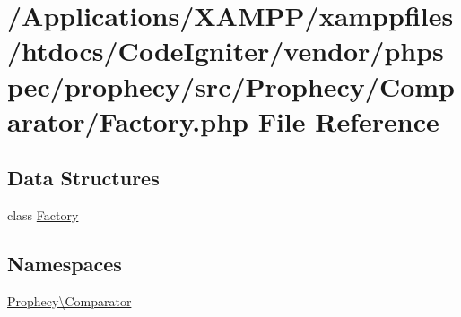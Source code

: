 \hypertarget{phpspec_2prophecy_2src_2_prophecy_2_comparator_2_factory_8php}{}\section{/\+Applications/\+X\+A\+M\+P\+P/xamppfiles/htdocs/\+Code\+Igniter/vendor/phpspec/prophecy/src/\+Prophecy/\+Comparator/\+Factory.php File Reference}
\label{phpspec_2prophecy_2src_2_prophecy_2_comparator_2_factory_8php}
\subsection*{Data Structures}
\begin{DoxyCompactItemize}
\item 
class \mbox{\hyperlink{class_prophecy_1_1_comparator_1_1_factory}{Factory}}
\end{DoxyCompactItemize}
\subsection*{Namespaces}
\begin{DoxyCompactItemize}
\item 
 \mbox{\hyperlink{namespace_prophecy_1_1_comparator}{Prophecy\textbackslash{}\+Comparator}}
\end{DoxyCompactItemize}
